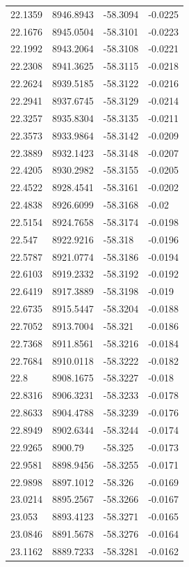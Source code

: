 \begin{table}[H]
\begin{tabular}{llll}
22.1359 & 8946.8943 & -58.3094 & -0.0225 \\
22.1676 & 8945.0504 & -58.3101 & -0.0223 \\
22.1992 & 8943.2064 & -58.3108 & -0.0221 \\
22.2308 & 8941.3625 & -58.3115 & -0.0218 \\
22.2624 & 8939.5185 & -58.3122 & -0.0216 \\
22.2941 & 8937.6745 & -58.3129 & -0.0214 \\
22.3257 & 8935.8304 & -58.3135 & -0.0211 \\
22.3573 & 8933.9864 & -58.3142 & -0.0209 \\
22.3889 & 8932.1423 & -58.3148 & -0.0207 \\
22.4205 & 8930.2982 & -58.3155 & -0.0205 \\
22.4522 & 8928.4541 & -58.3161 & -0.0202 \\
22.4838 & 8926.6099 & -58.3168 & -0.02 \\
22.5154 & 8924.7658 & -58.3174 & -0.0198 \\
22.547 & 8922.9216 & -58.318 & -0.0196 \\
22.5787 & 8921.0774 & -58.3186 & -0.0194 \\
22.6103 & 8919.2332 & -58.3192 & -0.0192 \\
22.6419 & 8917.3889 & -58.3198 & -0.019 \\
22.6735 & 8915.5447 & -58.3204 & -0.0188 \\
22.7052 & 8913.7004 & -58.321 & -0.0186 \\
22.7368 & 8911.8561 & -58.3216 & -0.0184 \\
22.7684 & 8910.0118 & -58.3222 & -0.0182 \\
22.8 & 8908.1675 & -58.3227 & -0.018 \\
22.8316 & 8906.3231 & -58.3233 & -0.0178 \\
22.8633 & 8904.4788 & -58.3239 & -0.0176 \\
22.8949 & 8902.6344 & -58.3244 & -0.0174 \\
22.9265 & 8900.79 & -58.325 & -0.0173 \\
22.9581 & 8898.9456 & -58.3255 & -0.0171 \\
22.9898 & 8897.1012 & -58.326 & -0.0169 \\
23.0214 & 8895.2567 & -58.3266 & -0.0167 \\
23.053 & 8893.4123 & -58.3271 & -0.0165 \\
23.0846 & 8891.5678 & -58.3276 & -0.0164 \\
23.1162 & 8889.7233 & -58.3281 & -0.0162 \\

\end{tabular}
\end{table}

